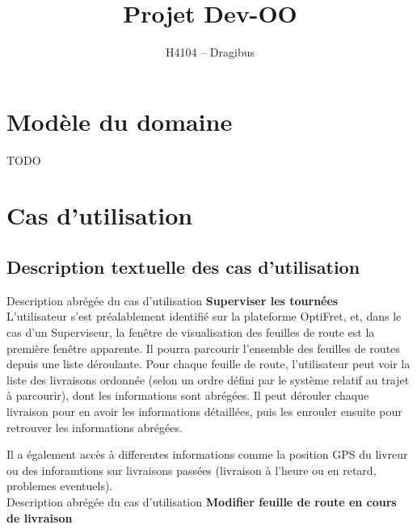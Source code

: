 \documentclass[a4paper, 10pt]{article}
\begin{document}
\title{Projet Dev-OO}
\author{H4104 -- Dragibus}

\maketitle
\pagebreak

\tableofcontents
\pagebreak


\section{Modèle du domaine}
{\huge TODO}

\section{Cas d'utilisation}

\subsection{Description textuelle des cas d'utilisation}

Description abrégée du cas d'utilisation
\textbf{Superviser les tournées} \\

L'utilisateur s'est préalablement identifié sur la plateforme OptiFret, et,
dans le cas d'un Superviseur, la fenêtre de visualisation des feuilles de route
est la première fenêtre apparente. Il pourra parcourir l'ensemble des feuilles
de routes depuis une liste déroulante. Pour chaque feuille de route,
l'utilisateur peut voir la liste des livraisons ordonnée (selon un ordre défini
par le système relatif au trajet à parcourir), dont les informations sont
abrégées. Il peut dérouler chaque livraison pour en avoir les informations
détaillées, puis les enrouler ensuite pour retrouver les informations abrégées.

Il a également accès à differentes informations comme la position GPS du
livreur ou des inforamtions sur livraisons passées (livraison à l'heure ou en
retard, problemes eventuels). \\


Description abrégée du cas d'utilisation
\textbf{Modifier feuille de route en cours de livraison} \\
\end{document}
